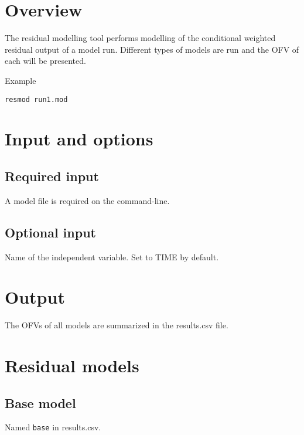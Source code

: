 



\maketitle
\newcommand{\guidetoolname}{resmod}


\section{Overview}
The residual modelling tool performs modelling of the conditional weighted residual output of a model run. Different types of models are run and the OFV of each will be presented.

Example
\begin{verbatim}
resmod run1.mod
\end{verbatim}

\section{Input and options}

\subsection{Required input}
A model file is required on the command-line.

\subsection{Optional input}

\begin{optionlist}
Name of the independent variable. Set to TIME by default.
\nextopt
\end{optionlist}

\section{Output}
The OFVs of all models are summarized in the results.csv file.

\section{Residual models}

\subsection{Base model}
Named \verb|base| in results.csv.

